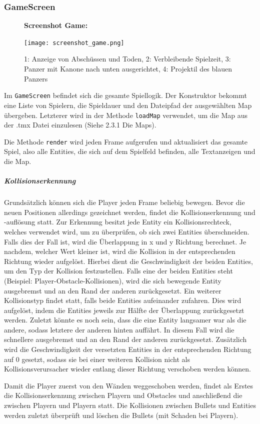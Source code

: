 \documentclass[a4paper]{scrreprt}
\def\code#1{\texttt{#1}}
\begin{document}
\subsubsection{GameScreen}
\begin{figure}[H]
  \textbf{Screenshot Game:}\par\medskip
  \centering
\texttt{[image: screenshot\_game.png]}    \caption{1: Anzeige von Abschüssen und Toden, 2: Verbleibende Spielzeit, 3: Panzer mit Kanone nach unten ausgerichtet, 4: Projektil des blauen Panzers}
\end{figure}
Im \code{GameScreen} befindet sich die gesamte Spiellogik. Der Konstruktor bekommt eine Liste von Spielern, die Spieldauer und den Dateipfad der ausgewählten Map übergeben.
Letzterer wird in der Methode \code{loadMap} verwendet, um die Map aus der .tmx Datei einzulesen (Siehe 2.3.1 Die Maps).

Die Methode \code{render} wird jeden Frame aufgerufen und aktualisiert das gesamte Spiel, also alle Entities, die sich auf dem Spielfeld befinden, alle Textanzeigen und die Map.
\subparagraph{Kollisionserkennung} Grundsätzlich können sich die Player jeden Frame beliebig bewegen. Bevor die neuen Positionen allerdings gezeichnet werden, findet die Kollisionserkennung und -auflösung statt. Zur Erkennung besitzt jede Entity ein Kollisionsrechteck, welches verwendet wird, um zu überprüfen, ob sich zwei Entities überschneiden. Falls dies der Fall ist, wird die Überlappung in x und y Richtung berechnet. Je nachdem, welcher Wert kleiner ist, wird die Kollision in der entsprechenden Richtung wieder aufgelöst.
Hierbei dient die Geschwindigkeit der beiden Entities, um den Typ der Kollision festzustellen. Falls eine der beiden Entities steht (Beispiel: Player-Obstacle-Kollisionen), wird die sich bewegende Entity ausgebremst und an den Rand der anderen zurückgesetzt. Ein weiterer Kollisionstyp findet statt, falls beide Entities aufeinander zufahren. Dies wird aufgelöst, indem die Entities jeweils zur Hälfte der Überlappung zurückgesetzt werden. Zuletzt könnte es noch sein, dass die eine Entity langsamer war als die andere, sodass letztere der anderen hinten auffährt. In diesem Fall wird die schnellere ausgebremst und an den Rand der anderen zurückgesetzt.
Zusätzlich wird die Geschwindigkeit der versetzten Entities in der entsprechenden Richtung auf 0 gesetzt, sodass sie bei einer weiteren Kollision nicht als Kollisionsverursacher wieder entlang dieser Richtung verschoben werden können.

Damit die Player zuerst von den Wänden weggeschoben werden, findet als Erstes die Kollisionserkennung zwischen Playern und Obstacles und anschließend die zwischen Playern und Playern statt. Die Kollisionen zwischen Bullets und Entities werden zuletzt überprüft und löschen die Bullets (mit Schaden bei Playern).
\newpage
\end{document}
